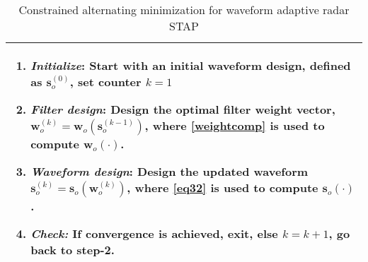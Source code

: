 \documentclass[11pt,draftclsnofoot,onecolumn]{IEEEtran}
\theoremstyle{definition}
\theoremstyle{remark}
\begin{document}
\begin{table}[htbp!] 
\centering
\caption{Constrained alternating minimization for waveform adaptive radar STAP}
\begin{tabular}{|p{3.3in}|} 
\hline
\begin{enumerate} \label{table1}
\item {\it Initialize}: Start with  an initial waveform design, defined as $\mathbf{s}_o^{(0)}$, set counter $k=1$
\item { \it Filter design}: Design the optimal filter weight vector, 
$\mathbf{w}_{o}^{(k)}=\mathbf{w}_o(\mathbf{s}_o^{(k-1)})$, where \eqref{weightcomp} is used to compute $\mathbf{w}_o( \cdot)$.
\item{ \it Waveform design}: Design the updated waveform $\mathbf{s}_o^{(k)}=\mathbf{s}_o(\mathbf{w}_o^{(k)})$, where \eqref{eq32} is used to compute $\mathbf{s}_o(\cdot)$.
\item {\it Check:} If convergence is achieved, exit, else $k=k+1$, go back to step-2.
\end{enumerate} \\
\hline
\end{tabular}
\end{table}
\end{document}
